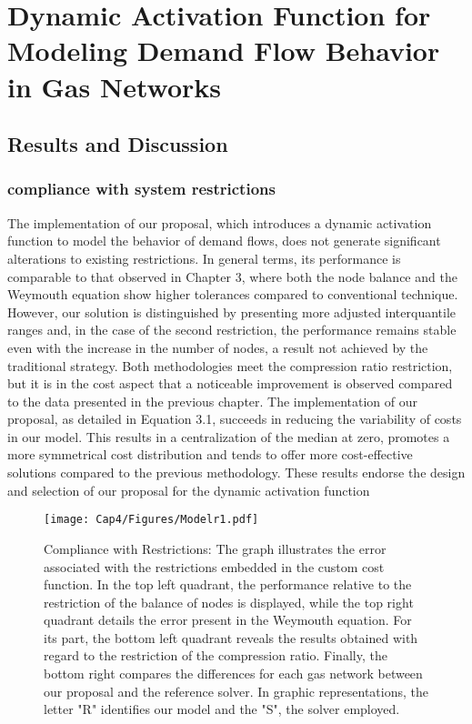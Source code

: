 \chapter{Dynamic Activation Function for Modeling Demand Flow Behavior in Gas Networks}
\label{ch:chapter_4}

\section{Results and Discussion}

\subsection{compliance with system restrictions }
The implementation of our proposal, which introduces a dynamic activation function to model the behavior of demand flows, does not generate significant alterations to existing restrictions. In general terms, its performance is comparable to that observed in Chapter 3, where both the node balance and the Weymouth equation show higher tolerances compared to conventional technique. However, our solution is distinguished by presenting more adjusted interquantile ranges and, in the case of the second restriction, the performance remains stable even with the increase in the number of nodes, a result not achieved by the traditional strategy. Both methodologies meet the compression ratio restriction, but it is in the cost aspect that a noticeable improvement is observed compared to the data presented in the previous chapter. The implementation of our proposal, as detailed in Equation 3.1, succeeds in reducing the variability of costs in our model. This results in a centralization of the median at zero, promotes a more symmetrical cost distribution and tends to offer more cost-effective solutions compared to the previous methodology. These results endorse the design and selection of our proposal for the dynamic activation function
\begin{figure}[H]
    \centering
    \texttt{[image: Cap4/Figures/Modelr1.pdf]}
    \caption{Compliance with Restrictions: The graph illustrates the error associated with the restrictions embedded in the custom cost function. In the top left quadrant, the performance relative to the restriction of the balance of nodes is displayed, while the top right quadrant details the error present in the Weymouth equation. For its part, the bottom left quadrant reveals the results obtained with regard to the restriction of the compression ratio. Finally, the bottom right compares the differences for each gas network between our proposal and the reference solver. In graphic representations, the letter "R" identifies our model and the "S", the solver employed. }
    \label{fig:ReM1}
\end{figure}

